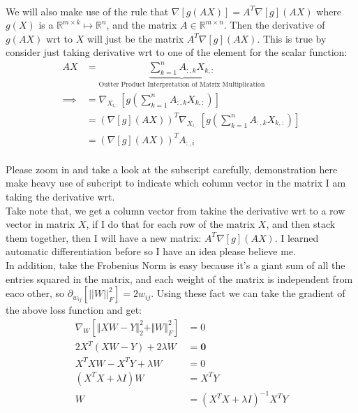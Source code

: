 \documentclass[]{article}
\begin{document}
            \\
            We will also make use of the rule that $\nabla [g(AX)] = A^T\nabla[g](AX)$ where $g(X)$ is a $\mathbb{R}^{m\times k}\mapsto \mathbb{R}^{n}$, and the matrix $A\in \mathbb{R}^{m\times n}$. Then the derivative of $g(AX)$ wrt to $X$ will just be the matrix $A^T\nabla[g](AX)$. This is true by consider just taking derivative wrt to one of the element for the scalar function:
            \begin{align*}\tag{A.6.1.1}\label{eqn:A.6.1.1}
                AX &= \underbrace{\sum_{k = 1}^{n}
                    A_{:, k}X_{k, :}}_{\text{Outter Product Interpretation of Matrix Multiplication}}
                \\
                \implies 
                &= \nabla_{X_{i, :}}\left[
                    g\left(
                        \sum_{k = 1}^{n}
                        A_{:, k}X_{k, :}
                    \right)
                \right]
                \\
                &= (\nabla[g](AX))^T\nabla_{X_{i, :}}
                \left[
                    g\left(
                        \sum_{k = 1}^{n}
                        A_{:, k}X_{k, :}
                    \right)
                \right]
                \\
                &= 
                (\nabla[g](AX))^TA_{:, i}
            \end{align*}
            \\
            Please zoom in and take a look at the subscript carefully, demonstration here make heavy use of subcript to indicate which column vector in the matrix I am taking the derivative wrt. 
            \\
            Take note that, we get a column vector from takine the derivative wrt to a row vector in matrix $X$, if I do that for each row of the matrix $X$, and then stack them together, then I will have a new matrix: $A^T\nabla[g](AX)$. I learned automatic differentiation before so I have an idea please believe me. 
            \\
            In addition, take the Frobenius Norm is easy because it's a giant sum of all the entries squared in the matrix, and each weight of the matrix is independent from eaco other, so $\partial_{w_{ij}}[||W||_F^2] = 2w_{ij}$. Using these fact we can take the gradient of the above loss function and get: 
            \begin{align*}\tag{A.6.2}\label{eqn:A.6.2}
                \nabla_W \left[
                    \Vert XW  - Y\Vert_2^2 + \Vert W\Vert_F^2
                \right] &= 0
                \\
                2X^T(XW - Y) + 2\lambda W &= \mathbf{0}
                \\
                X^TXW - X^TY + \lambda W &= 0 
                \\
                (X^TX + \lambda I)W &= X^TY
                \\
                W &= (X^TX + \lambda I)^{-1}X^TY
            \end{align*}
\end{document}
